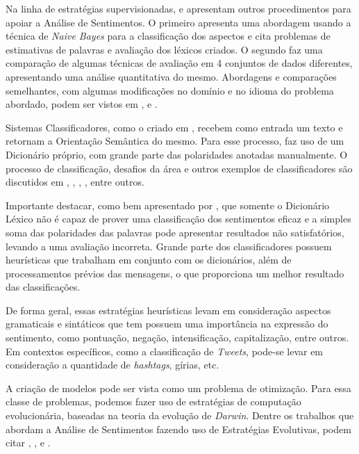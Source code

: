 \documentclass[12pt]{article}
\begin{document}
Na linha de estratégias supervisionadas, \cite{eisenstein2016unsupervised} e \cite{bandhakavi2016lexicon} apresentam outros procedimentos para apoiar a Análise de Sentimentos. O primeiro apresenta uma abordagem usando a técnica de \emph{Naive Bayes} para a classificação dos aspectos e cita problemas de estimativas de palavras e avaliação dos léxicos criados. O segundo faz uma comparação de algumas técnicas de avaliação em 4 conjuntos de dados diferentes, apresentando uma análise quantitativa do mesmo. Abordagens e comparações semelhantes, com algumas modificações no domínio e no idioma do problema abordado, podem ser vistos em \cite{khoo2017lexicon}, \cite{asghar2014review} e \cite{ding2008holistic}.

Sistemas Classificadores, como o criado em \cite{Rodrigues2016}, recebem como entrada um texto e retornam a Orientação Semântica do mesmo. Para esse processo, \cite{Rodrigues2016} faz uso de um Dicionário próprio, com grande parte das polaridades anotadas manualmente. O processo de classificação, desafios da área e outros exemplos de classificadores são discutidos em \cite{Pang2002}, \cite{Zhou2014}, \cite{silva2010automatic}, \cite{kdir16}, entre outros.

Importante destacar, como bem apresentado por \cite{araujo2013metodos}, que somente o Dicionário Léxico não é capaz de prover uma classificação dos sentimentos eficaz e a simples soma das polaridades das palavras pode apresentar resultados não satisfatórios, levando a uma avaliação incorreta. Grande parte dos classificadores possuem heurísticas que trabalham em conjunto com os dicionários, além de processamentos prévios das mensagens, o que proporciona um melhor resultado das classificações.

De forma geral, essas estratégias heurísticas levam em consideração aspectos gramaticais e sintáticos que tem possuem uma importância na expressão do sentimento, como pontuação, negação, intensificação, capitalização, entre outros. Em contextos específicos, como a classificação de \emph{Tweets}, pode-se levar em consideração a quantidade de \emph{hashtags}, gírias, etc.

A criação de modelos pode ser vista como um problema de otimização. Para essa classe de problemas, podemos fazer uso de estratégias de computação evolucionária, baseadas na teoria da evolução de \emph{Darwin}. Dentre os trabalhos que abordam a Análise de Sentimentos fazendo uso de Estratégias Evolutivas, podem citar \cite{ferreira2015using}, \cite{vohra2013comparative}, \cite{HADDI2013} e \cite{silveirageraccao}.
\end{document}
